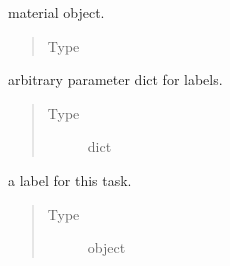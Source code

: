 \documentclass[letterpaper,10pt,english]{sphinxmanual}
\begin{document}
\begin{fulllineitems}
\begin{fulllineitems}
\begin{quote}
\begin{description}
\end{description}\end{quote}

\end{fulllineitems}


\begin{fulllineitems}
\label{\detokenize{interface:scdc.interface.EnsembleTask.material}}
material object.
\begin{quote}\begin{description}
\item[{Type}] \leavevmode
{}

\end{description}\end{quote}

\end{fulllineitems}


\begin{fulllineitems}
\label{\detokenize{interface:scdc.interface.EnsembleTask.params}}
arbitrary parameter dict for labels.
\begin{quote}\begin{description}
\item[{Type}] \leavevmode
dict

\end{description}\end{quote}

\end{fulllineitems}


\begin{fulllineitems}
\label{\detokenize{interface:scdc.interface.EnsembleTask.task_id}}
a label for this task.
\begin{quote}\begin{description}
\item[{Type}] \leavevmode
object


\end{description}
\end{quote}
\end{fulllineitems}
\end{fulllineitems}
\end{document}
